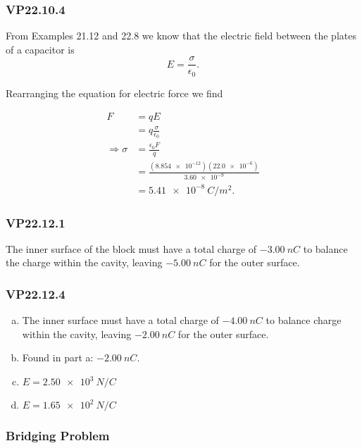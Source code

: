 \documentclass{article}
\begin{document}
\subsubsection{VP22.10.4}

From Examples 21.12 and 22.8 we know that the electric field between the plates of a capacitor is \[E = \frac{\sigma}{\epsilon_0}.\]

Rearranging the equation for electric force we find

\begin{align*}
  F                  & = qE                                                      \\
                     & = q\frac{\sigma}{\epsilon_0}                              \\
  \Rightarrow \sigma & = \frac{\epsilon_0 F}{q}                                  \\
                     & = \frac{(\num{8.854e-12}) (\num{22.0e-6})}{\num{3.60e-9}} \\
                     & = \qty{5.41e-8}{C/m^2}.
\end{align*}

\subsubsection{VP22.12.1}

The inner surface of the block must have a total charge of $\qty{-3.00}{nC}$ to balance the charge within the cavity, leaving $\qty{-5.00}{nC}$ for the outer surface.

\subsubsection{VP22.12.4}

\begin{enumerate}[a)]
  \item The inner surface must have a total charge of $\qty{-4.00}{nC}$ to balance charge within the cavity, leaving $\qty{-2.00}{nC}$ for the outer surface.

  \item Found in part a: $\qty{-2.00}{nC}$.

  \item $E = \qty{2.50e3}{N/C}$

  \item $E = \qty{1.65e2}{N/C}$
\end{enumerate}

\subsubsection{Bridging Problem}
\end{document}
